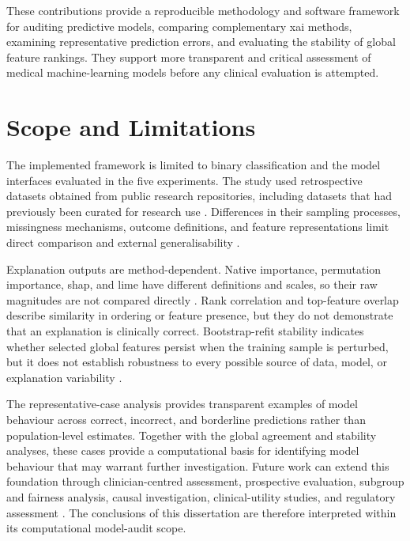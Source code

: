 These contributions provide a reproducible methodology and software framework for auditing predictive models, comparing complementary \gls{xai} methods, examining representative prediction errors, and evaluating the stability of global feature rankings. They support more transparent and critical assessment of medical machine-learning models before any clinical evaluation is attempted.


\section{Scope and Limitations}

The implemented framework is limited to binary classification and the model interfaces evaluated in the five experiments. The study used retrospective datasets obtained from public research repositories, including datasets that had previously been curated for research use \citep{khanna_comparative_2015, wu_machine_2024, chang_pima_2023, santhiya_chronic_2024, strack_impact_2014}. Differences in their sampling processes, missingness mechanisms, outcome definitions, and feature representations limit direct comparison and external generalisability \citep{moons_probastai_2025}.

Explanation outputs are method-dependent. Native importance, permutation importance, \gls{shap}, and \gls{lime} have different definitions and scales, so their raw magnitudes are not compared directly \citep{fisher_models_2019, NIPS2017_8a20a862, ribeiro_why_2016, vilone_classification_2021}. Rank correlation and top-feature overlap describe similarity in ordering or feature presence, but they do not demonstrate that an explanation is clinically correct. Bootstrap-refit stability indicates whether selected global features persist when the training sample is perturbed, but it does not establish robustness to every possible source of data, model, or explanation variability \citep{lofstrom_meta_2022, canha_functionally-grounded_2025}.

The representative-case analysis provides transparent examples of model behaviour across correct, incorrect, and borderline predictions rather than population-level estimates. Together with the global agreement and stability analyses, these cases provide a computational basis for identifying model behaviour that may warrant further investigation. Future work can extend this foundation through clinician-centred assessment, prospective evaluation, subgroup and fairness analysis, causal investigation, clinical-utility studies, and regulatory assessment \citep{moons_probastai_2025, vasey_decideai_2022}. The conclusions of this dissertation are therefore interpreted within its computational model-audit scope.

